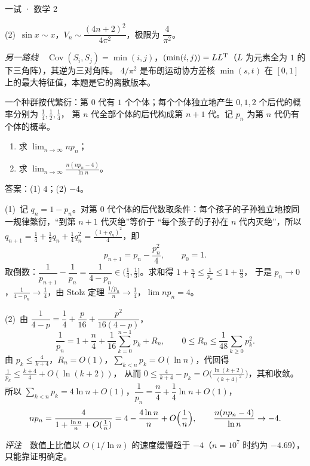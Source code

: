 \documentclass[cjk=noto, seal=first]{mojing-exam}
\begin{document}
\begin{paper}[time={建议 3 小时（训练设置）}, full=150]{一试 · 数学 2}
\begin{questions}
\begin{solution}
(2)~$\sin x\sim x$，$V_n\sim\dfrac{(4n+2)^2}{4\pi^2}$，极限为 $\dfrac4{\pi^2}$。

\emph{另一路线}　$\operatorname{Cov}(S_i,S_j)=\min(i,j)$，$(\min(i,j))=LL^{\mathrm{T}}$（$L$ 为元素全为 $1$ 的下三角阵），其逆为三对角阵。
$4/\pi^2$ 是布朗运动协方差核 $\min(s,t)$ 在 $[0,1]$ 上的最大特征值，本题是它的离散版本。
\end{solution}

\question[25]
一个种群按代繁衍：第 $0$ 代有 $1$ 个个体；每个个体独立地产生 $0,1,2$ 个后代的概率分别为 $\frac14,\frac12,\frac14$，
第 $n$ 代全部个体的后代构成第 $n+1$ 代。记 $p_n$ 为第 $n$ 代仍有个体的概率。
\begin{enumerate}
  \item 求 $\displaystyle\lim_{n\to\infty}np_n$；
  \item 求 $\displaystyle\lim_{n\to\infty}\frac{n(np_n-4)}{\ln n}$。
\end{enumerate}
\answerspace{2cm}
\begin{solution}
答案：(1) $4$；(2) $-4$。

(1)~记 $q_n=1-p_n$。对第 $0$ 代个体的后代数取条件：每个孩子的子孙独立地按同一规律繁衍，“到第 $n+1$ 代灭绝”等价于
“每个孩子的子孙在 $n$ 代内灭绝”，所以 $q_{n+1}=\frac14+\frac12q_n+\frac14q_n^2=\frac{(1+q_n)^2}{4}$，即
\[
  p_{n+1}=p_n-\frac{p_n^2}{4},\qquad p_0=1 .
\]
取倒数：$\dfrac1{p_{n+1}}-\dfrac1{p_n}=\dfrac{1}{4-p_n}\in\bigl(\frac14,\frac13\bigr]$。求和得 $1+\frac n4\le\frac1{p_n}\le1+\frac n3$，
于是 $p_n\to0$，$\frac1{4-p_n}\to\frac14$，由 Stolz 定理 $\frac{1/p_n}{n}\to\frac14$，$\lim np_n=4$。

(2)~由 $\dfrac1{4-p}=\dfrac14+\dfrac p{16}+\dfrac{p^2}{16(4-p)}$，
\[
  \frac1{p_n}=1+\frac n4+\frac1{16}\sum_{k=0}^{n-1}p_k+R_n,\qquad 0\le R_n\le\frac1{48}\sum_{k\ge0}p_k^2 .
\]
由 $p_k\le\frac4{k+4}$，$R_n=O(1)$，$\sum_{k<n}p_k=O(\ln n)$，代回得 $\frac1{p_k}\le\frac{k+4}4+O(\ln(k+2))$，
从而 $0\le\frac4{k+4}-p_k=O\bigl(\frac{\ln(k+2)}{(k+4)^2}\bigr)$，其和收敛。
所以 $\sum_{k<n}p_k=4\ln n+O(1)$，$\dfrac1{p_n}=\dfrac n4+\dfrac14\ln n+O(1)$，
\[
  np_n=\frac{4}{1+\frac{\ln n}{n}+O(\frac1n)}=4-\frac{4\ln n}{n}+O\Bigl(\frac1n\Bigr),\qquad \frac{n(np_n-4)}{\ln n}\to-4 .
\]

\emph{评注}　数值上比值以 $O(1/\ln n)$ 的速度缓慢趋于 $-4$（$n=10^7$ 时约为 $-4.69$），只能靠证明确定。
\end{solution}


\end{questions}
\end{paper}
\end{document}
